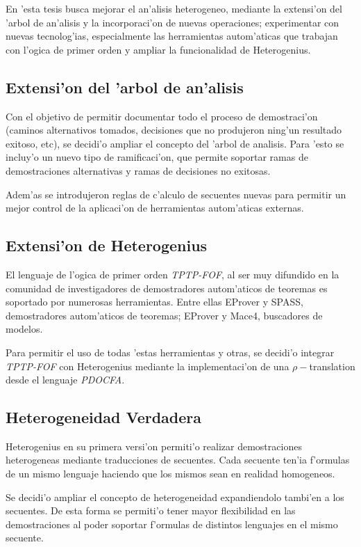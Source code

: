 En 'esta tesis busca mejorar el an'alisis heterogeneo, mediante la extensi'on del 'arbol de an'alisis y la incorporaci'on de nuevas operaciones; experimentar con nuevas tecnolog'ias, especialmente las herramientas autom'aticas que trabajan con l'ogica de primer orden y ampliar la funcionalidad de Heterogenius.


\subsection{Extensi'on del 'arbol de an'alisis}

Con el objetivo de permitir documentar todo el proceso de demostraci'on (caminos alternativos tomados, decisiones que no produjeron ning'un resultado exitoso, etc), se decidi'o ampliar el concepto del 'arbol de analisis. Para 'esto se incluy'o un nuevo tipo de ramificaci'on, que permite soportar ramas de demostraciones alternativas y ramas de decisiones no exitosas.

Adem'as se introdujeron reglas de c'alculo de secuentes nuevas para permitir un mejor control de la aplicaci'on de herramientas autom'aticas externas.


\subsection{Extensi'on de Heterogenius}

El lenguaje de l'ogica de primer orden \textit{TPTP-FOF}, al ser muy difundido en la comunidad de investigadores de demostradores autom'aticos de teoremas es soportado por numerosas herramientas. Entre ellas EProver y SPASS, demostradores autom'aticos de teoremas; EProver y Mace4, buscadores de modelos. 

Para permitir el uso de todas 'estas herramientas y otras, se decidi'o integrar \textit{TPTP-FOF} con Heterogenius mediante la implementaci'on de una $\rho-$translation desde el lenguaje \textit{PDOCFA}.


\subsection{Heterogeneidad Verdadera}

Heterogenius en su primera versi'on permiti'o realizar demostraciones heterogeneas mediante traducciones de secuentes. Cada secuente ten'ia f'ormulas de un mismo lenguaje haciendo que los mismos sean en realidad homogeneos.

Se decidi'o ampliar el concepto de heterogeneidad expandiendolo tambi'en a los secuentes. De esta forma se permiti'o tener mayor flexibilidad en las demostraciones al poder soportar f'ormulas de distintos lenguajes en el mismo secuente.

